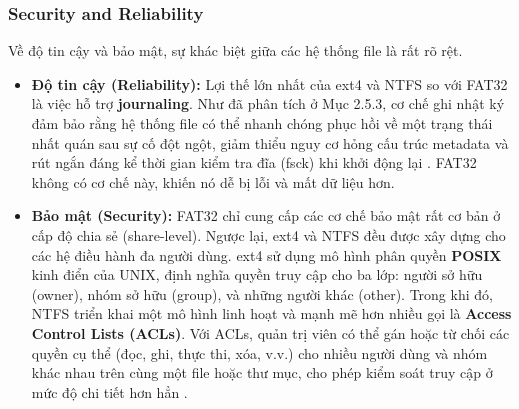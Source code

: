 \documentclass[12pt]{article}
\begin{document}
\subsubsection{Security and Reliability}
Về độ tin cậy và bảo mật, sự khác biệt giữa các hệ thống file là rất rõ rệt.
\begin{itemize}
    \item \textbf{Độ tin cậy (Reliability):} Lợi thế lớn nhất của ext4 và NTFS so với FAT32 là việc hỗ trợ \textbf{journaling}. Như đã phân tích ở Mục 2.5.3, cơ chế ghi nhật ký đảm bảo rằng hệ thống file có thể nhanh chóng phục hồi về một trạng thái nhất quán sau sự cố đột ngột, giảm thiểu nguy cơ hỏng cấu trúc metadata và rút ngắn đáng kể thời gian kiểm tra đĩa (fsck) khi khởi động lại \parencite{Prabhakaran2005journaling}. FAT32 không có cơ chế này, khiến nó dễ bị lỗi và mất dữ liệu hơn.

    \item \textbf{Bảo mật (Security):} FAT32 chỉ cung cấp các cơ chế bảo mật rất cơ bản ở cấp độ chia sẻ (share-level). Ngược lại, ext4 và NTFS đều được xây dựng cho các hệ điều hành đa người dùng. ext4 sử dụng mô hình phân quyền \textbf{POSIX} kinh điển của UNIX, định nghĩa quyền truy cập cho ba lớp: người sở hữu (owner), nhóm sở hữu (group), và những người khác (other). Trong khi đó, NTFS triển khai một mô hình linh hoạt và mạnh mẽ hơn nhiều gọi là \textbf{Access Control Lists (ACLs)}. Với ACLs, quản trị viên có thể gán hoặc từ chối các quyền cụ thể (đọc, ghi, thực thi, xóa, v.v.) cho nhiều người dùng và nhóm khác nhau trên cùng một file hoặc thư mục, cho phép kiểm soát truy cập ở mức độ chi tiết hơn hẳn \parencite{Bundele2018}.
\end{itemize}
\end{document}
